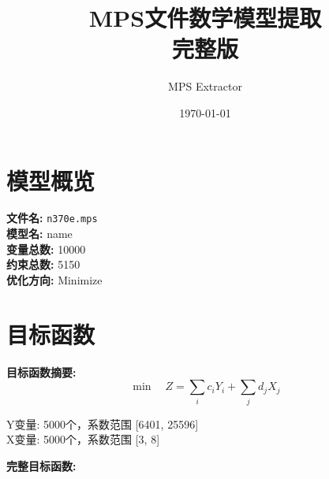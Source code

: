 \documentclass[a4paper,10pt]{article}
\title{MPS文件数学模型提取\\{\large 完整版}}
\author{MPS Extractor}
\date{\today}
\begin{document}
\maketitle
\tableofcontents
\newpage

\section{模型概览}

\textbf{文件名:} \texttt{n370e.mps} \\
\textbf{模型名:} name \\
\textbf{变量总数:} 10000 \\
\textbf{约束总数:} 5150 \\
\textbf{优化方向:} Minimize \\

\section{目标函数}

\textbf{目标函数摘要:}
\begin{equation}
\min \quad Z = \sum_{i} c_i Y_i + \sum_{j} d_j X_j
\end{equation}

Y变量: 5000个，系数范围 [6401, 25596] \\
X变量: 5000个，系数范围 [3, 8]

\textbf{完整目标函数:}
\end{document}
